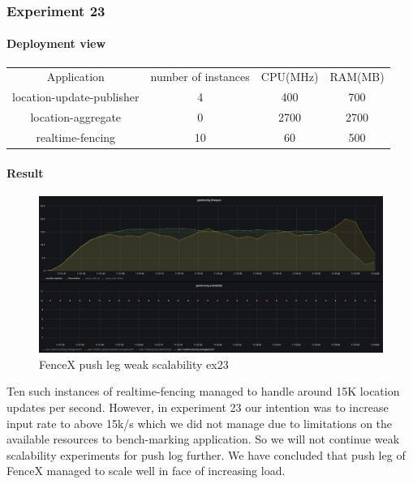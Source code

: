\documentclass[a4]{report}
\begin{document}
        \subsubsection{Experiment 23}

        \paragraph{Deployment view}
        \begin{center}
            \begin{tabular}{ c c c c }
                Application               & number of instances & CPU(MHz) & RAM(MB) \\
                location-update-publisher & 4                   & 400      & 700     \\
                location-aggregate        & 0                   & 2700     & 2700    \\
                realtime-fencing          & 10                  & 60       & 500     \\
            \end{tabular}
        \end{center}

        \paragraph{Result}
        \begin{figure}[ht]
            \caption{FenceX push leg weak scalability ex23}
            \label{fig:ex23}
            \includegraphics[scale=0.4]{images/evaluation/ex23-benchmarking-ongoing-2per2sec.png}
        \end{figure}
        Ten such instances of realtime-fencing managed to handle around 15K location updates per second.
        However, in experiment 23 our intention was to increase input rate to above 15k/s which we did not manage due to
        limitations on the available resources to bench-marking application.
        So we will not continue weak scalability experiments for push log further.
        We have concluded that push leg of FenceX managed to scale well in face of increasing load.
\end{document}
